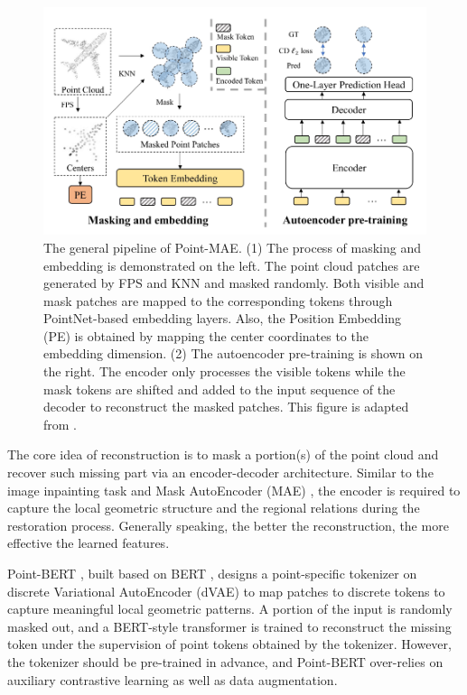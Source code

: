 \documentclass[a4paper,fleqn]{cas-dc}
\begin{document}
\begin{figure}[htbp]
    \centering
    \includegraphics[width=0.97\linewidth]{Point-MAE.png}
    \caption{The general pipeline of Point-MAE. (1) The process of masking and embedding is demonstrated on the left. The point cloud patches are generated by FPS and KNN and masked randomly. Both visible and mask patches are mapped to the corresponding tokens through PointNet-based embedding layers. Also, the Position Embedding (PE) is obtained by mapping the center coordinates to the embedding dimension. (2) The autoencoder pre-training is shown on the right. The encoder only processes the visible tokens while the mask tokens are shifted and added to the input sequence of the decoder to reconstruct the masked patches. This figure is adapted from \citep{pang2022masked}.}
    \label{fig:Point-MAE}
\end{figure}

The core idea of reconstruction is to mask a portion(s) of the point cloud and recover such missing part via an encoder-decoder architecture. Similar to the image inpainting task \citep{sarmad2019rl} and Mask AutoEncoder (MAE) \citep{hess2022masked}, the encoder is required to capture the local geometric structure and the regional relations during the restoration process. Generally speaking, the better the reconstruction, the more effective the learned features.

Point-BERT \citep{yu2021point}, built based on BERT \citep{devlin2018bert}, designs a point-specific tokenizer on discrete Variational AutoEncoder (dVAE) to map patches to discrete tokens to capture meaningful local geometric patterns. A portion of the input is randomly masked out, and a BERT-style transformer is trained to reconstruct the missing token under the supervision of point tokens obtained by the tokenizer. However, the tokenizer should be pre-trained in advance, and Point-BERT over-relies on auxiliary contrastive learning as well as data augmentation. 
\end{document}
